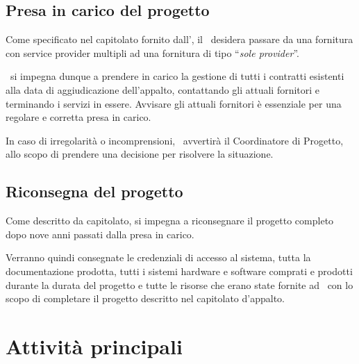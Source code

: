 	\subsection{Presa in carico del progetto}
	
		Come specificato nel capitolato fornito dall'\istituto, il \proponente~desidera passare da una fornitura con service provider multipli ad una fornitura di tipo ``\textit{sole provider}''.
	
		\azienda~si impegna dunque a prendere in carico la gestione di tutti i contratti esistenti alla data di aggiudicazione dell'appalto, contattando gli attuali fornitori e terminando i servizi in essere.
		Avvisare gli attuali fornitori è essenziale per una regolare e corretta presa in carico.
		
		In caso di irregolarità o incomprensioni, \azienda~avvertirà il Coordinatore di Progetto, allo scopo di prendere una decisione per risolvere la situazione.
	
	\subsection{Riconsegna del progetto}
	
		Come descritto da capitolato, \azienda si impegna a riconsegnare il progetto completo dopo nove anni passati dalla presa in carico.

		Verranno quindi consegnate le credenziali di accesso al sistema, tutta la documentazione prodotta, tutti i sistemi hardware e software comprati e prodotti durante la durata del progetto e tutte le risorse che erano state fornite ad \azienda~con lo scopo di completare il progetto descritto nel capitolato d'appalto.

\section{Attività principali}\label{sec:attivita_principali}

